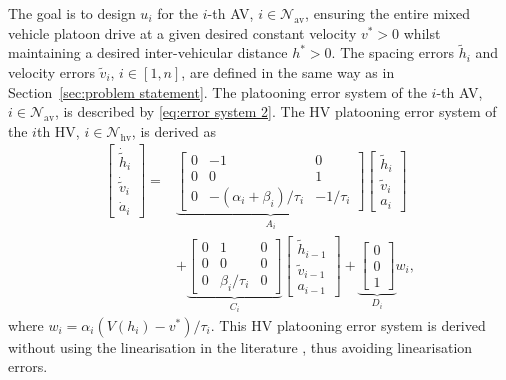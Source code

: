 \documentclass[letterpaper, 10 pt, conference]{ieeeconf}
\begin{document}
The goal is to design $u_i$ for the $i$-th AV, $i \in \mathcal{N}_\text{av}$, ensuring the entire mixed vehicle platoon drive at a 
given desired constant velocity $v^* > 0$ whilst maintaining a desired inter-vehicular distance $h^* > 0$. The spacing errors $\tilde{h}_i$ and 
velocity errors $\tilde{v}_i$,  $i \in [1,n]$, are defined in the same way as 
in Section~\ref{sec:problem statement}. The platooning error system of the 
$i$-th AV, $i \in \mathcal{N}_\text{av}$, is described by \eqref{eq:error system 2}. 
The HV platooning error system of the $i$th HV, $i \in \mathcal{N}_\text{hv}$, 
is derived as
\begin{align}\label{mixeq:error system HV}
		\begin{bmatrix}
			\dot{\tilde{h}}_i \\ \dot{\tilde{v}}_i \\ \dot{a}_i
		\end{bmatrix}
		=&
		\underbrace{\begin{bmatrix}
				0 & -1 & 0 \\ 
				0 & 0 & 1 \\ 
				0 & -(\alpha_i + \beta_i)/\tau_i & -1/\tau_i
		\end{bmatrix}}_{A_i}	
		\begin{bmatrix}
			\tilde{h}_i \\ \tilde{v}_i 	\\ a_i
		\end{bmatrix} \nonumber\\
		& +
		\underbrace{\begin{bmatrix}
				0 & 1 & 0 \\0 & 0 & 0 \\0 & \beta_i/\tau_i & 0
		\end{bmatrix}}_{C_i}
		\begin{bmatrix}
			\tilde{h}_{i-1} \\ \tilde{v}_{i-1} \\ a_{i-1}
		\end{bmatrix} +
		\underbrace{\begin{bmatrix}
				0 \\ 0 \\ 1
		\end{bmatrix}}_{D_i} w_i,
\end{align} 
where $w_i =\alpha_i( V(h_i) - v^* )/\tau_i$. 
This HV platooning error system is derived without using the linearisation in the literature \cite{gao2016data,huang2019connected,huang2020learning,Lan+21d,Wang+22}, thus avoiding linearisation errors. 
	
\end{document}
